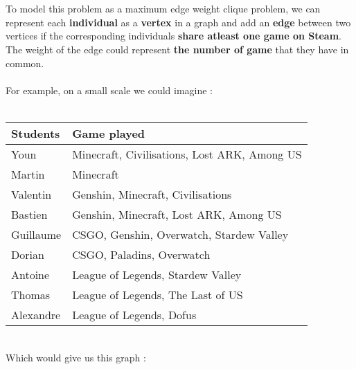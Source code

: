     \\ \\
    To model this problem as a maximum edge weight clique problem, we can represent each \textbf{individual} as a \textbf{vertex} in a graph and add an \textbf{edge} between two vertices if the corresponding individuals \textbf{share atleast one game on Steam}. The weight of the edge could represent \textbf{the number of game} that they have in common.
    \\ \\
    For example, on a small scale we could imagine :
    \\ \\
    \begin{tabular}{|p{}|p{}|}
        \hline
        \textbf{Students} & \textbf{Game played} \\
        \hline
        Youn & Minecraft, Civilisations, Lost ARK, Among US \\
        \hline
        Martin & Minecraft \\
        \hline
        Valentin & Genshin, Minecraft, Civilisations \\
        \hline
        Bastien & Genshin, Minecraft, Lost ARK, Among US \\
        \hline
        Guillaume & CSGO, Genshin, Overwatch, Stardew Valley\\
        \hline
        Dorian & CSGO, Paladins, Overwatch \\
        \hline
        Antoine & League of Legends, Stardew Valley \\
        \hline
        Thomas & League of Legends, The Last of US \\
        \hline
        Alexandre & League of Legends, Dofus \\
        \hline
    \end{tabular}
    \vspace{1\baselineskip} \\
    Which would give us this graph :

    \begin{center}
    \end{center}
    

